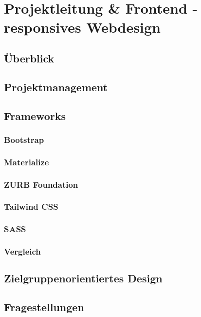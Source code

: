 \section{Projektleitung \& Frontend - responsives Webdesign}
	\subsection{Überblick}
	\subsection{Projektmanagement}
	\subsection{Frameworks}
		\subsubsection{Bootstrap}
		\subsubsection{Materialize}
		\subsubsection{ZURB Foundation}
		\subsubsection{Tailwind CSS}
		\subsubsection{SASS}
		\subsubsection{Vergleich}
	\subsection{Zielgruppenorientiertes Design}
	\subsection{Fragestellungen}
